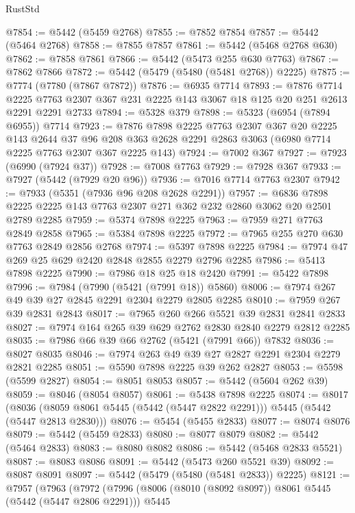 \begin{lexlean}{RustStd}
\begin{coremodule}
@7854 := @5442 (@5459 @2768)
@7855 := @7852 @7854
@7857 := @5442 (@5464 @2768)
@7858 := @7855 @7857
@7861 := @5442 (@5468 @2768 @630)
@7862 := @7858 @7861
@7866 := @5442 (@5473 @255 @630 @7763)
@7867 := @7862 @7866
@7872 := @5442 (@5479 (@5480 (@5481 @2768)) @2225)
@7875 := @7774 (@7780 (@7867 @7872))
@7876 := @6935 @7714
@7893 := @7876
    @7714
    @2225
    @7763
    @2307
    @367
    @231
    @2225
    @143
    @3067
    @18
    @125
    @20
    @251
    @2613
    @2291
    @2291
    @2733
@7894 := @5328 @379
@7898 := @5323 (@6954 (@7894 @6955)) @7714
@7923 := @7876
    @7898
    @2225
    @7763
    @2307
    @367
    @20
    @2225
    @143
    @2644
    @37
    @96
    @208
    @363
    @2628
    @2291
    @2863
    @3063
    (@6980 @7714 @2225 @7763 @2307 @367 @2225 @143)
@7924 := @7002 @367
@7927 := @7923 (@6990 (@7924 @37))
@7928 := @7008 @7763
@7929 := @7928 @367
@7933 := @7927 (@5442 (@7929 @20 @96))
@7936 := @7016 @7714 @7763 @2307
@7942 := @7933 (@5351 (@7936 @96 @208 @2628 @2291))
@7957 := @6836 @7898 @2225 @2225 @143 @7763 @2307 @271 @362 @232 @2860 @3062 @20 @2501 @2789 @2285
@7959 := @5374 @7898 @2225
@7963 := @7959 @271 @7763 @2849 @2858
@7965 := @5384 @7898 @2225
@7972 := @7965 @255 @270 @630 @7763 @2849 @2856 @2768
@7974 := @5397 @7898 @2225
@7984 := @7974 @47 @269 @25 @629 @2420 @2848 @2855 @2279 @2796 @2285
@7986 := @5413 @7898 @2225
@7990 := @7986 @18 @25 @18 @2420
@7991 := @5422 @7898
@7996 := @7984 (@7990 (@5421 (@7991 @18)) @5860)
@8006 := @7974 @267 @49 @39 @27 @2845 @2291 @2304 @2279 @2805 @2285
@8010 := @7959 @267 @39 @2831 @2843
@8017 := @7965 @260 @266 @5521 @39 @2831 @2841 @2833
@8027 := @7974 @164 @265 @39 @629 @2762 @2830 @2840 @2279 @2812 @2285
@8035 := @7986 @66 @39 @66 @2762 (@5421 (@7991 @66)) @7832
@8036 := @8027 @8035
@8046 := @7974 @263 @49 @39 @27 @2827 @2291 @2304 @2279 @2821 @2285
@8051 := @5590 @7898 @2225 @39 @262 @2827
@8053 := @5598 (@5599 @2827)
@8054 := @8051 @8053
@8057 := @5442 (@5604 @262 @39)
@8059 := @8046 (@8054 @8057)
@8061 := @5438 @7898 @2225
@8074 := @8017
    (@8036 (@8059 @8061 @5445 (@5442 (@5447 @2822 @2291))) @5445 (@5442 (@5447 @2813 @2830)))
@8076 := @5454 (@5455 @2833)
@8077 := @8074 @8076
@8079 := @5442 (@5459 @2833)
@8080 := @8077 @8079
@8082 := @5442 (@5464 @2833)
@8083 := @8080 @8082
@8086 := @5442 (@5468 @2833 @5521)
@8087 := @8083 @8086
@8091 := @5442 (@5473 @260 @5521 @39)
@8092 := @8087 @8091
@8097 := @5442 (@5479 (@5480 (@5481 @2833)) @2225)
@8121 := @7957
    (@7963
      (@7972
        (@7996
          (@8006 (@8010 (@8092 @8097)) @8061 @5445 (@5442 (@5447 @2806 @2291)))
          @5445

\end{coremodule}
\end{lexlean}
